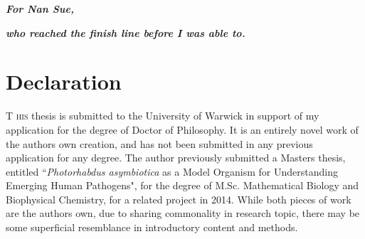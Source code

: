 \documentclass[a4paper, oneside, 11pt]{report} %
\begin{document}
\clearpage
\thispagestyle{empty}
\vspace*{1cm}
\begin{center}
\begin{minipage}{0.8\textwidth}
\centering
\Large
\textbf{\textit{For Nan Sue,}}

\textbf{\textit{who reached the finish line before I was able to.}}
\end{minipage}
\end{center}

\clearpage



\rhead{\textsf{}}
\chapter*{Declaration}

\lettrine[lraise=0.0, nindent=0.1em, slope=1em]{T}{ his} thesis is submitted to the University of Warwick in support of my application for the degree of Doctor of Philosophy. It is an entirely novel work of the authors own creation, and has not been submitted in any previous application for any degree. The author previously submitted a Masters thesis, entitled ``\emph{Photorhabdus asymbiotica} as a Model Organism for Understanding Emerging Human Pathogens", for the degree of M.Sc. Mathematical Biology and Biophysical Chemistry, for a related project in 2014. While both pieces of work are the authors own, due to sharing commonality in research topic, there may be some superficial resemblance in introductory content and methods.
\end{document}
